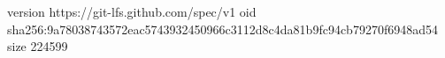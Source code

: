 version https://git-lfs.github.com/spec/v1
oid sha256:9a78038743572eac5743932450966c3112d8c4da81b9fc94cb79270f6948ad54
size 224599
